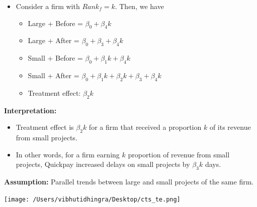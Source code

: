 \documentclass[
]{article}
\providecommand{\tightlist}{%
  \setlength{\itemsep}{0pt}\setlength{\parskip}{0pt}}
\begin{document}
\begin{itemize}
\tightlist
\item
  Consider a firm with \(Rank_f = k\). Then, we have

  \begin{itemize}
  \tightlist
  \item
    Large + Before = \(\beta_0 + \beta_4 k\)
  \item
    Large + After = \(\beta_0+\beta_3 +\beta_4 k\)
  \item
    Small + Before = \(\beta_0+\beta_1 k + \beta_4 k\)
  \item
    Small + After =
    \(\beta_0+\beta_1 k + \beta_2 k + \beta_3 + \beta_4 k\)
  \item
    Treatment effect: \(\beta_2 k\)
  \end{itemize}
\end{itemize}

\textbf{Interpretation:}

\begin{itemize}
\tightlist
\item
  Treatment effect is \(\beta_2 k\) for a firm that received a
  proportion \(k\) of its revenue from small projects.
\item
  In other words, for a firm earning \(k\) proportion of revenue from
  small projects, Quickpay increased delays on small projects by
  \(\beta_3 k\) days.
\end{itemize}

\textbf{Assumption:} Parallel trends between large and small projects of
the same firm.

\texttt{[image: /Users/vibhutidhingra/Desktop/cts\_te.png]}
\end{document}
